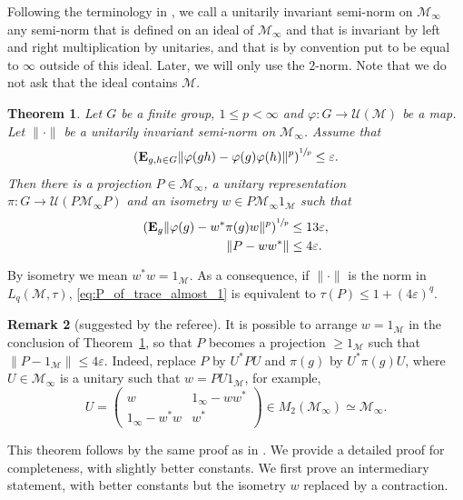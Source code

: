 \documentclass[JEP,XML,SOM,Unicode,published]{cedram}
\theoremstyle{plain}
\newtheorem{theorem}{Theorem}[section]
\theoremstyle{definition}
\newtheorem{remark}[theorem]{Remark}
\newcommand{\cM}{\mathcal{M}}
\newcommand{\E}{\mathbf{E}}
\newcommand{\cU}{\mathcal{U}}
\begin{document}
Following the terminology in \cite{MR3867328}, we call a unitarily invariant semi-norm on $\cM_\infty$ any semi-norm that is defined on an ideal of $\cM_\infty$ and that is invariant by left and right multiplication by unitaries, and that is by convention put to be equal to $\infty$ outside of this ideal. Later, we will only use the $2$-norm. Note that we do not ask that the ideal contains $\cM$.
\begin{theorem}\label{thm:averageGowersHatami} Let $G$ be a finite group, $1 \leq p < \infty$ and $\varphi:G \to \cU(\cM)$ be a map. Let $\|{\cdot}\|$ be a unitarily invariant semi-norm on $\cM_\infty$. Assume that
\[
\left(\E_{g,h \in G} \|\varphi(gh)-\varphi(g)\varphi(h)\|^p\right)^{\sfrac 1 p} \leq \varepsilon.
\]
Then there is a projection $P \in \cM_\infty$, a unitary representation $\pi: G \to \cU(P\cM_\infty P)$ and an isometry $w \in P \cM_\infty 1_\cM$ such that
\begin{align}\label{eq:varphi_close_to_rep}
\left(\E_g \|\varphi(g)-w^* \pi(g) w\|^p\right)^{\sfrac 1 p}&\leq 13\varepsilon,
\\
\label{eq:P_of_trace_almost_1} \|P-ww^*\| &\leq 4\varepsilon.
\end{align}
\end{theorem}

By isometry we mean $w^*w=1_\cM$. As a consequence, if $\|{\cdot}\|$ is the norm in $L_q(\cM,\tau)$, \eqref{eq:P_of_trace_almost_1} is equivalent to $\tau(P) \leq 1+(4\varepsilon)^q$.

\begin{remark}[suggested by the referee]\label{rem:added_by_referee}
It is possible to arrange $w=1_\cM$ in the conclusion of Theorem~\ref{thm:averageGowersHatami}, so that $P$ becomes a projection $\geq 1_\cM$ such that \hbox{$\|P-1_\cM\|\leq 4\varepsilon$}. Indeed, replace $P$ by $U^* P U$ and $\pi(g)$ by $U^* \pi(g) U$, where $U \in \cM_\infty$ is a unitary such that $w=PU 1_\cM$, for example,
\[
U=\begin{pmatrix} w & 1_\infty - ww^*\\1_\infty-w^*w& w^*\end{pmatrix} \in M_2(\cM_\infty) \simeq \cM_\infty.
\]
\end{remark}

This theorem follows by the same proof as in \cite{MR3867328}. We provide a detailed proof for completeness, with slightly better constants. We first prove an intermediary statement, with better constants but the isometry $w$ replaced by a contraction.
\end{document}
